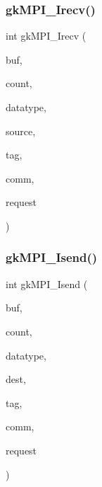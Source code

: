 \mbox{\label{a00359_af66daa80152ba26f528a2c6d9c86e98c}} 
\subsubsection{\texorpdfstring{gk\+M\+P\+I\+\_\+\+Irecv()}{gkMPI\_Irecv()}}
{\footnotesize\ttfamily int gk\+M\+P\+I\+\_\+\+Irecv (\begin{DoxyParamCaption}\item[{void $\ast$}]{buf,  }\item[{\hyperlink{a00876_aaa5262be3e700770163401acb0150f52}{idx\+\_\+t}}]{count,  }\item[{M\+P\+I\+\_\+\+Datatype}]{datatype,  }\item[{\hyperlink{a00876_aaa5262be3e700770163401acb0150f52}{idx\+\_\+t}}]{source,  }\item[{\hyperlink{a00876_aaa5262be3e700770163401acb0150f52}{idx\+\_\+t}}]{tag,  }\item[{M\+P\+I\+\_\+\+Comm}]{comm,  }\item[{M\+P\+I\+\_\+\+Request $\ast$}]{request }\end{DoxyParamCaption})}

\mbox{\label{a00359_a575274feee728e0cabbca8b68fcea3fb}} 
\subsubsection{\texorpdfstring{gk\+M\+P\+I\+\_\+\+Isend()}{gkMPI\_Isend()}}
{\footnotesize\ttfamily int gk\+M\+P\+I\+\_\+\+Isend (\begin{DoxyParamCaption}\item[{void $\ast$}]{buf,  }\item[{\hyperlink{a00876_aaa5262be3e700770163401acb0150f52}{idx\+\_\+t}}]{count,  }\item[{M\+P\+I\+\_\+\+Datatype}]{datatype,  }\item[{\hyperlink{a00876_aaa5262be3e700770163401acb0150f52}{idx\+\_\+t}}]{dest,  }\item[{\hyperlink{a00876_aaa5262be3e700770163401acb0150f52}{idx\+\_\+t}}]{tag,  }\item[{M\+P\+I\+\_\+\+Comm}]{comm,  }\item[{M\+P\+I\+\_\+\+Request $\ast$}]{request }\end{DoxyParamCaption})}

